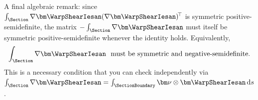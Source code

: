 \begin{Quote}
A final algebraic remark: since \(\int_{\Section}\nabla\bm\WarpShearIesan(\nabla\bm\WarpShearIesan)^{\!\top}\) is symmetric positive-semidefinite, the matrix \(-\int_{\Section}\nabla\bm\WarpShearIesan\) must itself be symmetric positive-semidefinite whenever the identity holds. Equivalently,
\[
\int_{\Section}\nabla\bm\WarpShearIesan\ \text{ must be symmetric and negative-semidefinite.}
\]
This is a necessary condition that you can check independently via \(\int_{\Section}\nabla\bm\WarpShearIesan=\int_{\SectionBoundary}\bm\nu\otimes\bm\WarpShearIesan\,\mathrm{d}s\).

\end{Quote}

